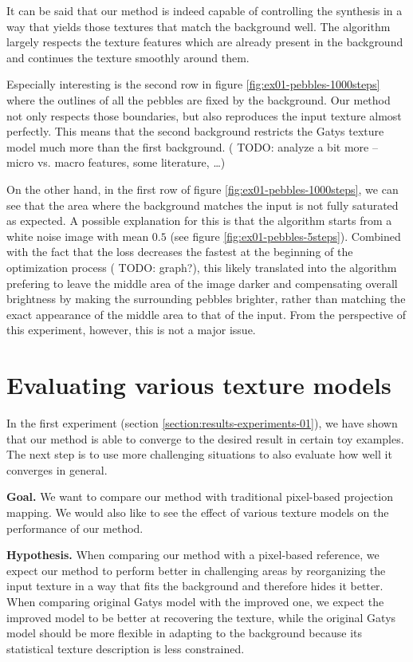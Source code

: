 It can be said that our method is indeed capable of controlling the synthesis in a way that yields those textures that match the background well. The algorithm largely respects the texture features which are already present in the background and continues the texture smoothly around them. 

Especially interesting is the second row in figure \ref{fig:ex01-pebbles-1000steps} where the outlines of all the pebbles are fixed by the background. Our method not only respects those boundaries, but also reproduces the input texture almost perfectly. This means that the second background restricts the Gatys texture model much more than the first background. ({\color{red} TODO: analyze a bit more -- micro vs. macro features, some literature, \dots})

On the other hand, in the first row of figure \ref{fig:ex01-pebbles-1000steps}, we can see that the area where the background matches the input is not fully saturated as expected. A possible explanation for this is that the algorithm starts from a white noise image with mean \(0.5\) (see figure \ref{fig:ex01-pebbles-5steps}). Combined with the fact that the loss decreases the fastest at the beginning of the optimization process ({\color{red} TODO: graph?}), this likely translated into the algorithm prefering to leave the middle area of the image darker and compensating overall brightness by making the surrounding pebbles brighter, rather than matching the exact appearance of the middle area to that of the input. From the perspective of this experiment, however, this is not a major issue.

\section{Evaluating various texture models}
\label{section:results-experiments-02}

In the first experiment (section \ref{section:results-experiments-01}), we have shown that our method is able to converge to the desired result in certain toy examples. The next step is to use more challenging situations to also evaluate how well it converges in general. 

\textbf{Goal.} We want to compare our method with traditional pixel-based projection mapping. We would also like to see the effect of various texture models on the performance of our method.

\textbf{Hypothesis.} When comparing our method with a pixel-based reference, we expect our method to perform better in challenging areas by reorganizing the input texture in a way that fits the background and therefore hides it better. When comparing original Gatys model with the improved one, we expect the improved model to be better at recovering the texture, while the original Gatys model should be more flexible in adapting to the background because its statistical texture description is less constrained.

